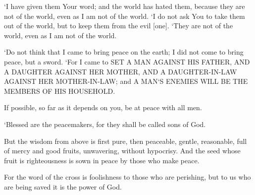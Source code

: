 \vspace{2\baselineskip}

\begin{scripture}[John 17:14-16]
    `I have given them Your word; and the world has hated them, because they are not of the world, even as I am not of the world.
    `I do not ask You to take them out of the world, but to keep them from the evil [one].
    `They are not of the world, even as I am not of the world.
\end{scripture}

\vspace{2\baselineskip}

\begin{scripture}[Matthew 10:34-36]
    `Do not think that I came to bring peace on the earth; I did not come to bring peace, but a sword.
    `For I came to SET A MAN AGAINST HIS FATHER, AND A DAUGHTER AGAINST HER MOTHER, AND A DAUGHTER-IN-LAW AGAINST HER MOTHER-IN-LAW;
    and A MAN`S ENEMIES WILL BE THE MEMBERS OF HIS HOUSEHOLD.
\end{scripture}

\vspace{2\baselineskip}

\begin{scripture}[Romans 12:18]
    If possible, so far as it depends on you, be at peace with all men.
\end{scripture}

\vspace{2\baselineskip}

\begin{scripture}[Matthew 5:9]
    `Blessed are the peacemakers, for they shall be called sons of God.
\end{scripture}

\vspace{2\baselineskip}

\begin{scripture}[James 3:17-18]
    But the wisdom from above is first pure, then peaceable, gentle, reasonable, full of mercy and good fruits, unwavering, without hypocrisy.
    And the seed whose fruit is righteousness is sown in peace by those who make peace.
\end{scripture}

\vspace{2\baselineskip}

\begin{scripture}[1 Corinthians 1:18]
    For the word of the cross is foolishness to those who are perishing, but to us who are being saved it is the power of God.
\end{scripture}

